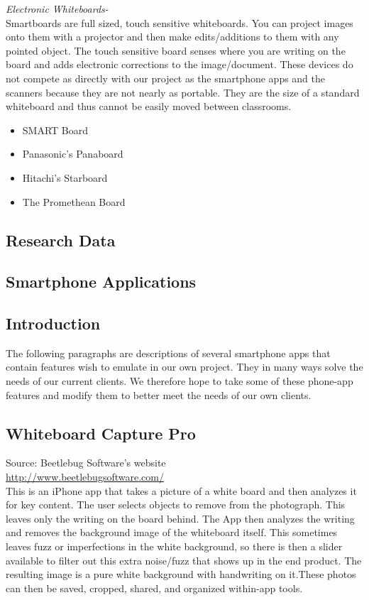 \documentclass{article}
\begin{document}
		
		\noindent \emph{Electronic Whiteboards-} \\
Smartboards are full sized, touch sensitive whiteboards. You can project images onto them with a projector and then make edits/additions to them with any pointed object. The touch sensitive board senses where you are writing on the board and adds electronic corrections to the image/document. These devices do not compete as directly with our project as the smartphone apps and the scanners because they are not nearly as portable. They are the size of a standard whiteboard and thus cannot be easily moved between classrooms.
            \begin{itemize}
                \item SMART Board
                \item Panasonic's Panaboard
                \item Hitachi's Starboard
                \item The Promethean Board
            \end{itemize}
			
		\subsection*{Research Data}
		
			\subsection*{Smartphone Applications}

			\subsection*{Introduction}
The following paragraphs are descriptions of several smartphone apps that contain features wish to emulate in our own project. They in many ways solve the needs of our current clients. We therefore hope to take some of these phone-app features and modify them to better meet the needs of our own clients. \\
				\subsection*{Whiteboard Capture Pro}
Source: Beetlebug Software's website\\
{\color{red} \url{http://www.beetlebugsoftware.com/}} \\
					
This is an iPhone app that takes a picture of a white board and then analyzes it for key content. The user selects objects to remove from the photograph. This leaves only the writing on the board behind. The App then analyzes the writing and removes the background image of the whiteboard itself. This sometimes leaves fuzz or imperfections in the white background, so there is then a slider available to filter out this extra noise/fuzz that shows up in the end product. The resulting image is a pure white background with handwriting on it.These photos can then be saved, cropped, shared, and organized within-app tools. \\
\end{document}

